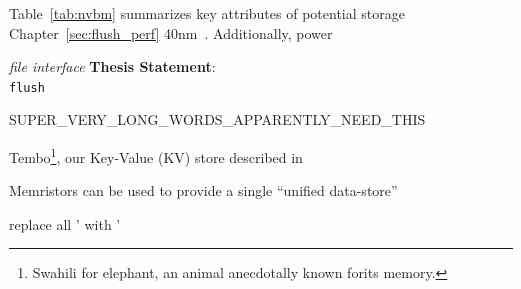 
Table~\ref{tab:nvbm} summarizes key attributes of potential storage
Chapter~\ref{sec:flush_perf} 
40nm~\citep{ITRS07,Mandelman02,Mueller05}.  Additionally, power


\textit{file interface}
\textbf{Thesis Statement}:
\\
\texttt{flush}


\begin{sloppypar}
SUPER_VERY_LONG_WORDS_APPARENTLY_NEED_THIS
\end{sloppypar}


Tembo\footnote{Swahili for elephant, an animal anecdotally known forits memory.}, our Key-Value (KV) store described in


Memristors can be used to provide a single ``unified data-store''







replace all ’ with '

